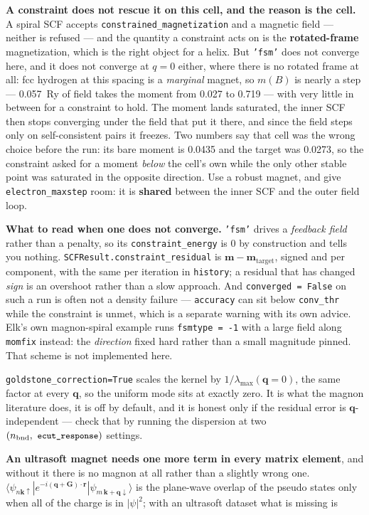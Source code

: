 \documentclass[11pt,a4paper]{article}
\newcommand{\code}[1]{\texttt{\small #1}}
\begin{document}
\textbf{A constraint does not rescue it on this cell, and the reason is the cell.}
A spiral SCF accepts \code{constrained\_magnetization} and a magnetic field ---
neither is refused --- and the quantity a constraint acts on is the
\textbf{rotated-frame} magnetization, which is the right object for a helix. But
\code{'fsm'} does not converge here, and it does not converge at $q = 0$ either,
where there is no rotated frame at all: fcc hydrogen at this spacing is a
\emph{marginal} magnet, so $m(B)$ is nearly a step --- 0.057~Ry of field takes the
moment from 0.027 to 0.719 --- with very little in between for a constraint to
hold. The moment lands saturated, the inner SCF then stops converging under the
field that put it there, and since the field steps only on self-consistent pairs it
freezes. Two numbers say that cell was the wrong choice before the run: its bare
moment is 0.0435 and the target was 0.0273, so the constraint asked for a moment
\emph{below} the cell's own while the only other stable point was saturated in the
opposite direction. Use a robust magnet, and give \code{electron\_maxstep} room:
it is \textbf{shared} between the inner SCF and the outer field loop.

\textbf{What to read when one does not converge.} \code{'fsm'} drives a
\emph{feedback field} rather than a penalty, so its \code{constraint\_energy} is
0 by construction and tells you nothing. \code{SCFResult.constraint\_residual} is
$\mathbf m - \mathbf m_{\text{target}}$, signed and per component, with the same
per iteration in \code{history}; a residual that has changed \emph{sign} is an
overshoot rather than a slow approach. And \code{converged = False} on such a run
is often not a density failure --- \code{accuracy} can sit below
\code{conv\_thr} while the constraint is unmet, which is a separate warning with
its own advice. Elk's own magnon-spiral example runs \code{fsmtype = -1} with a
large field along \code{momfix} instead: the \emph{direction} fixed hard rather
than a small magnitude pinned. That scheme is not implemented here.

\code{goldstone\_correction=True} scales the kernel by
$1/\lambda_{\max}(\mathbf q{=}0)$, the same factor at every $\mathbf q$, so the
uniform mode sits at exactly zero. It is what the magnon literature does, it is
off by default, and it is honest only if the residual error is
$\mathbf q$-independent --- check that by running the dispersion at two
$(n_{\text{bnd}},\ \code{ecut\_response})$ settings.

\textbf{An ultrasoft magnet needs one more term in every matrix element}, and
without it there is no magnon at all rather than a slightly wrong one.
$\langle\psi_{n\mathbf k\uparrow}|e^{-i(\mathbf q+\mathbf G)\cdot\mathbf r}
|\psi_{m\,\mathbf k+\mathbf q\downarrow}\rangle$ is the plane-wave overlap of
the pseudo states only when all of the charge is in $|\psi|^2$; with an
ultrasoft dataset what is missing is
\end{document}
